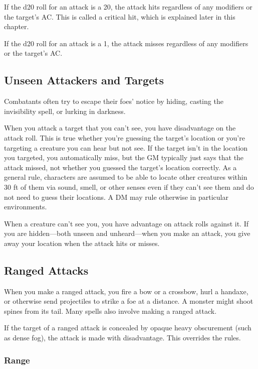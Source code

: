 If the d20 roll for an attack is a 20, the attack hits regardless of any modifiers or the target's AC. This is called a critical hit, which is explained later in this chapter.

If the d20 roll for an attack is a 1, the attack misses regardless of any modifiers or the target's AC.

\subsection{Unseen Attackers and Targets}\label{subsec:unseen-attackers}

Combatants often try to escape their foes' notice by hiding, casting the invisibility spell, or lurking in darkness.

When you attack a target that you can't see, you have disadvantage on the attack roll. This is true whether you're guessing the target's location or you're targeting a creature you can hear but not see. If the target isn't in the location you targeted, you automatically miss, but the GM typically just says that the attack missed, not whether you guessed the target's location correctly. As a general rule, characters are assumed to be able to locate other creatures within 30 ft of them via sound, smell, or other senses even if they can't see them and do not need to guess their locations. A DM may rule otherwise in particular environments.

When a creature can't see you, you have advantage on attack rolls against it. If you are hidden—both unseen and unheard—when you make an attack, you give away your location when the attack hits or misses.

\subsection{Ranged Attacks}

When you make a ranged attack, you fire a bow or a crossbow, hurl a handaxe, or otherwise send projectiles to strike a foe at a distance. A monster might shoot spines from its tail. Many spells also involve making a ranged attack.

If the target of a ranged attack is concealed by opaque heavy obscurement (such as dense fog), the attack is made with disadvantage. This overrides the  rules.

\subsubsection{Range}

